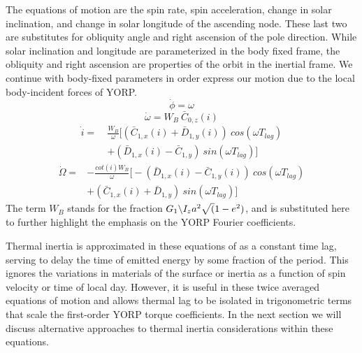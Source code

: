 \documentclass[12pt,notitlepage]{article}
\begin{document}
The equations of motion are the spin rate, spin acceleration, change in solar inclination, and change in solar longitude of the ascending node. These last two are substitutes for obliquity angle and right ascension of the pole direction. While solar inclination and longitude are parameterized in the body fixed frame, the obliquity and right ascension are properties of the orbit in the inertial frame. We continue with body-fixed parameters in order express our motion due to the local body-incident forces of YORP.
\begin{equation}
    \dot{\phi} = \omega
\end{equation}
\begin{equation}
    \dot{\omega} = \mathit{W}_B \:\bar{C}_{0,z}(i)
\end{equation}
\begin{equation}
    \begin{split}
    \dot{i} = \:&\frac{\mathit{W}_B}{\omega}\Big[(\bar{C}_{1,x}(i)+\bar{D}_{1,y}(i))\: cos(\omega T_{lag}) \\
    & + (\bar{D}_{1,x}(i)-\bar{C}_{1,y})\: sin(\omega T_{lag})\Big]
    \end{split}
\end{equation}
\begin{equation}
    \begin{split}
    \dot{\Omega} = &-\frac{cot(i)\mathit{W}_B}{\omega}\Big[- (\bar{D}_{1,x}(i)-\bar{C}_{1,y}(i)) \:cos(\omega T_{lag}) \\
    & + (\bar{C}_{1,x}(i)+\bar{D}_{1,y}) \:sin(\omega T_{lag})\Big]
    \end{split}
\end{equation}
The term $W_B$ stands for the fraction $G_1 \symbol{92} I_z a^2 \sqrt(1-e^2)$, and is substituted here to further highlight the emphasis on the YORP Fourier coefficients. 

Thermal inertia is approximated in these equations of as a constant time lag, serving to delay the time of emitted energy by some fraction of the period. This ignores the variations in materials of the surface or inertia as a function of spin velocity or time of local day. However, it is useful in these twice averaged equations of motion and allows thermal lag to be isolated in trigonometric terms that scale the first-order YORP torque coefficients. In the next section we will discuss alternative approaches to thermal inertia considerations within these equations. 
\end{document}
